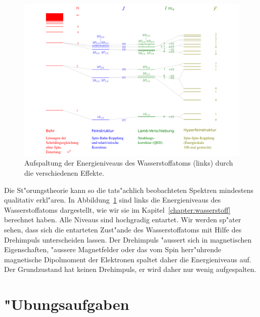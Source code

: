 \begin{figure}
\centering
\includegraphics[width=\hsize]{images/WasserstoffAufspaltung.pdf}
\caption{Aufspaltung der Energieniveaus des Wasserstoffatoms (links)
durch die verschiedenen Effekte.
\label{skript:wasserstoffaufspaltung}}
\end{figure}
Die St"orungstheorie kann so die tats"achlich beobachteten Spektren
mindestens qualitativ erkl"aren.
In Abbildung~\ref{skript:wasserstoffaufspaltung} sind links die Energieniveaus
des Wasserstoffatoms dargestellt, wie wir sie im Kapitel~\ref{chapter:wasserstoff}
berechnet haben.
Alle Niveaus sind hochgradig entartet.
Wir werden sp"ater sehen, dass sich die entarteten Zust"ande des
Wasserstoffatoms mit Hilfe des Drehimpuls unterscheiden lassen.
Der Drehimpuls "aussert sich in magnetischen Eigenschaften,
"aussere Magnetfelder oder das vom Spin herr"uhrende magnetische Dipolmoment
der Elektronen spaltet daher die Energieniveaus auf.
Der Grundzustand hat keinen Drehimpuls, er wird daher nur wenig
aufgespalten.

%
%

\section*{"Ubungsaufgaben}
\begin{uebungsaufgaben}
\item

\item

\end{uebungsaufgaben}
